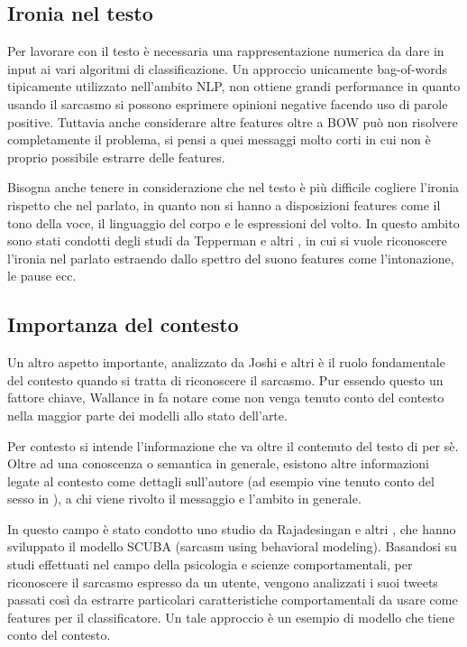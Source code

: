 \documentclass[oneside]{book}
\begin{document}
\subsection{Ironia nel testo}
Per lavorare con il testo è necessaria una rappresentazione numerica da dare in input ai vari algoritmi di classificazione. Un approccio unicamente bag-of-words tipicamente utilizzato nell'ambito NLP, non ottiene grandi performance in quanto usando il sarcasmo si possono esprimere opinioni negative facendo uso di parole positive. Tuttavia anche considerare altre features oltre a BOW può non risolvere completamente il problema, si pensi a quei messaggi molto corti in cui non è proprio possibile estrarre delle features.

Bisogna anche tenere in considerazione che nel testo è più difficile cogliere l'ironia rispetto che nel parlato, in quanto non si hanno a disposizioni features come il tono della voce, il linguaggio del corpo e le espressioni del volto. In questo ambito sono stati condotti degli studi da Tepperman e altri \cite{audio-sarcasm}, in cui si vuole riconoscere l'ironia nel parlato estraendo dallo spettro del suono features come l'intonazione, le pause ecc.


\subsection{Importanza del contesto}
Un altro aspetto importante, analizzato da Joshi e altri \cite{survey5} è il ruolo fondamentale del contesto quando si tratta di riconoscere il sarcasmo. Pur essendo questo un fattore chiave, Wallance in \cite{survey4} fa notare come non venga tenuto conto del contesto nella maggior parte dei modelli allo stato dell'arte.

Per contesto si intende l'informazione che va oltre il contenuto del testo di per sè. Oltre ad una conoscenza o semantica in generale, esistono altre informazioni legate al contesto come dettagli sull'autore (ad esempio vine tenuto conto del sesso in \cite{audio-sarcasm}), a chi viene rivolto il messaggio e l'ambito in generale.

In questo campo è stato condotto uno studio da Rajadesingan e altri \cite{scuba}, che hanno sviluppato il modello SCUBA (sarcasm using behavioral modeling). Basandosi su studi effettuati nel campo della psicologia e scienze comportamentali, per riconoscere il sarcasmo espresso da un utente, vengono analizzati i suoi tweets passati così da estrarre particolari caratteristiche comportamentali da usare come features per il classificatore. Un tale approccio è un esempio di modello che tiene conto del contesto.
\end{document}
